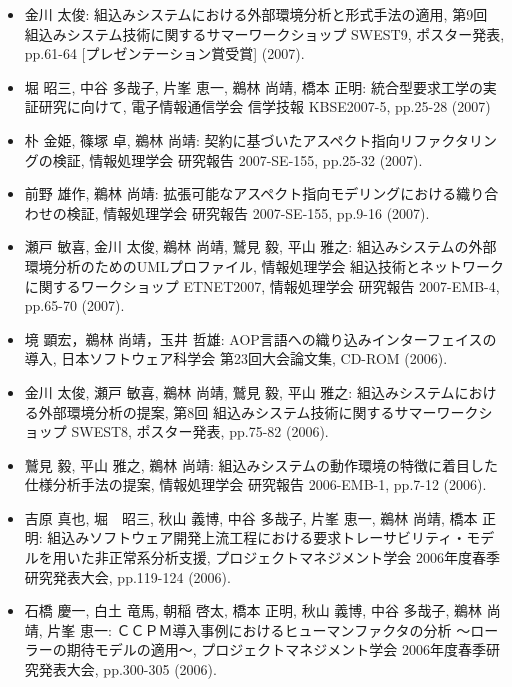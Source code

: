 \documentclass{jarticle}
\begin{document}
\begin{itemize}
\item 金川 太俊:
組込みシステムにおける外部環境分析と形式手法の適用,
第9回 組込みシステム技術に関するサマーワークショップ SWEST9,
ポスター発表, pp.61-64 [プレゼンテーション賞受賞] (2007).

\item 堀 昭三, 中谷 多哉子, 片峯 恵一, 鵜林 尚靖, 橋本 正明:
統合型要求工学の実証研究に向けて,
電子情報通信学会 信学技報 KBSE2007-5, pp.25-28 (2007)

\item 朴 金姫, 篠塚 卓, 鵜林 尚靖:
契約に基づいたアスペクト指向リファクタリングの検証,
情報処理学会 研究報告 2007-SE-155, pp.25-32 (2007).

\item 前野 雄作, 鵜林 尚靖:
拡張可能なアスペクト指向モデリングにおける織り合わせの検証,
情報処理学会 研究報告 2007-SE-155, pp.9-16 (2007).

\item 瀬戸 敏喜, 金川 太俊, 鵜林 尚靖, 鷲見 毅, 平山 雅之:
組込みシステムの外部環境分析のためのUMLプロファイル,
情報処理学会 組込技術とネットワークに関するワークショップ ETNET2007,
情報処理学会 研究報告 2007-EMB-4, pp.65-70 (2007).

\item 境 顕宏，鵜林 尚靖，玉井 哲雄:
AOP言語への織り込みインターフェイスの導入,
日本ソフトウェア科学会 第23回大会論文集, CD-ROM (2006).

\item 金川 太俊, 瀬戸 敏喜, 鵜林 尚靖, 鷲見 毅, 平山 雅之:
組込みシステムにおける外部環境分析の提案,
第8回 組込みシステム技術に関するサマーワークショップ SWEST8,
ポスター発表, pp.75-82 (2006).

\item 鷲見 毅, 平山 雅之, 鵜林 尚靖:
組込みシステムの動作環境の特徴に着目した仕様分析手法の提案,
情報処理学会 研究報告 2006-EMB-1, pp.7-12 (2006).

\item 吉原 真也, 堀　昭三, 秋山 義博, 中谷 多哉子, 片峯 恵一, 鵜林 尚靖, 橋本 正明:
組込みソフトウェア開発上流工程における要求トレーサビリティ・モデルを用いた非正常系分析支援,
プロジェクトマネジメント学会 2006年度春季研究発表大会, pp.119-124 (2006).

\item 石橋 慶一, 白土 竜馬, 朝稲 啓太, 橋本 正明, 秋山 義博, 中谷 多哉子, 鵜林 尚靖, 片峯 恵一:
ＣＣＰＭ導入事例におけるヒューマンファクタの分析 〜ローラーの期待モデルの適用〜,
プロジェクトマネジメント学会 2006年度春季研究発表大会, pp.300-305 (2006).


\end{itemize}
\end{document}
